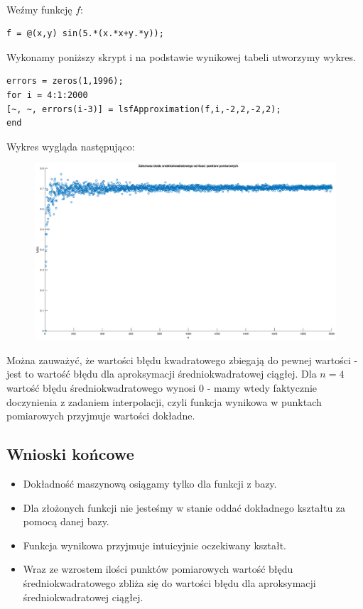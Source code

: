 \documentclass{article}
\begin{document}
\paragraph{}
Weźmy funkcję $f$:
\begin{lstlisting}[style=Matlab-editor]
f = @(x,y) sin(5.*(x.*x+y.*y));
\end{lstlisting}
Wykonamy poniższy skrypt i na podstawie wynikowej tabeli utworzymy wykres.
\begin{lstlisting}[style=Matlab-editor]
errors = zeros(1,1996);
for i = 4:1:2000
[~, ~, errors(i-3)] = lsfApproximation(f,i,-2,2,-2,2);
end
\end{lstlisting}
Wykres wygląda następująco:
\begin{figure}[H]
  \includegraphics[width=\linewidth]{fig4.eps}
\end{figure}
Można zauważyć, że wartości błędu kwadratowego zbiegają do pewnej wartości - jest to wartość błędu dla aproksymacji średniokwadratowej ciągłej. Dla $n=4$ wartość błędu średniokwadratowego wynosi 0 - mamy wtedy faktycznie doczynienia z zadaniem interpolacji, czyli funkcja wynikowa w punktach pomiarowych przyjmuje wartości dokładne.
\subsection{Wnioski końcowe}
\begin{itemize}
\item Dokładność maszynową osiągamy tylko dla funkcji z bazy.
\item Dla złożonych funkcji nie jesteśmy w stanie oddać dokładnego kształtu za pomocą danej bazy.
\item Funkcja wynikowa przyjmuje intuicyjnie oczekiwany kształt.
\item Wraz ze wzrostem ilości punktów pomiarowych wartość błędu średniokwadratowego zbliża się do wartości błędu dla aproksymacji średniokwadratowej ciągłej.
\end{itemize}
\end{document}
